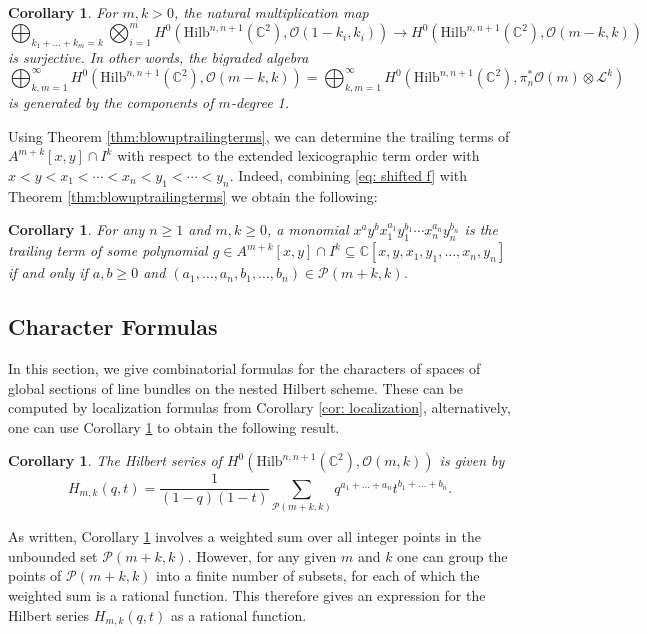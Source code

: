 \documentclass[12pt]{amsart}
\newcommand{\Hilb}{\mathrm{Hilb}}
\newcommand{\C}{\mathbb{C}}
\newcommand{\CL}{\mathcal{L}}
\newcommand{\CO}{\mathcal{O}}
\numberwithin{equation}{section}
\newtheorem{corollary}[theorem]{Corollary}
\theoremstyle{definition}
\begin{document}
\begin{corollary}\label{cor:surjectivity}
For $m,k>0$, the natural multiplication map
$$
\bigoplus_{k_1+\ldots+k_m=k}\bigotimes_{i=1}^{m}H^0(\Hilb^{n,n+1}(\C^2),\CO(1-k_i,k_i))\to H^0(\Hilb^{n,n+1}(\C^2),\CO(m-k,k))
$$
is surjective. In other words, the bigraded algebra 
$$
\bigoplus_{k,m=1}^{\infty}H^0(\Hilb^{n,n+1}(\C^2),\CO(m-k,k))=\bigoplus_{k,m=1}^{\infty}H^0(\Hilb^{n,n+1}(\C^2),\pi_n^*\CO(m)\otimes \CL^k)
$$
is generated by the components of $m$-degree 1. 
\end{corollary}


Using Theorem \ref{thm:blowuptrailingterms}, we can determine the trailing terms of $A^{m+k}[x,y]\cap I^k$ with respect to the extended lexicographic term order with $x<y<x_1<\cdots<x_n<y_1<\cdots<y_n$. Indeed, combining \eqref{eq: shifted f} with Theorem \ref{thm:blowuptrailingterms} we obtain the following:

\begin{corollary}\label{cor:trailingterms}
        For any $n\geq 1$ and $m,k\geq 0$, a monomial $x^a y^b x_1^{a_1}y_1^{b_1}\cdots x_n^{a_n}y_n^{b_n}$ is the trailing term of some polynomial $g\in A^{m+k}[x,y]\cap I^k \subseteq \C[x,y,x_1,y_1,\dots,x_n,y_n]$ if and only if $a,b\geq 0$ and $(a_1,\dots,a_n,b_1,\dots,b_n)\in \mathcal{P}(m+k,k)$.
\end{corollary}

\subsection{Character Formulas}\label{sec: character formulas}

In this section, we give combinatorial formulas for the characters of spaces of global sections of line bundles on the nested Hilbert scheme. These can be computed by localization formulas from Corollary \ref{cor: localization}, alternatively, one can use Corollary \ref{cor:trailingterms} to obtain the following result. 

\begin{corollary}
\label{cor: Hilbert series}
The Hilbert series of $H^0\left(\Hilb^{n,n+1}(\C^2),\CO(m,k)\right)$ is given by 
$$
H_{m,k}(q,t)=\frac{1}{(1-q)(1-t)}\sum_{\mathcal{P}(m+k,k)}q^{a_1+\ldots+a_n}t^{b_1+\ldots+b_n}.
$$
\end{corollary}




As written, Corollary \ref{cor: Hilbert series} involves a weighted sum over all integer points in the unbounded set $\mathcal{P}(m+k,k)$. However, for any given $m$ and $k$ one can group the points of $\mathcal{P}(m+k,k)$ into a finite number of subsets, for each of which the weighted sum is a rational function. This therefore gives an expression for the Hilbert series $H_{m,k}(q,t)$ as a rational function.
\end{document}
